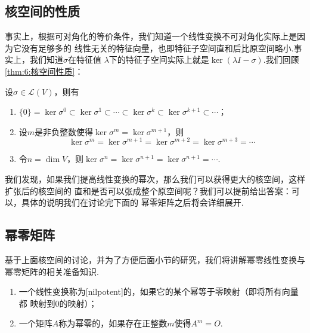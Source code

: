 \subsection{核空间的性质}
事实上，根据可对角化的等价条件，我们知道一个线性变换不可对角化实际上是因为它没有足够多的
线性无关的特征向量，也即特征子空间直和后比原空间略小.事实上，我们知道$\sigma$在特征值
$\lambda$下的特征子空间实际上就是$\ker(\lambda I-\sigma)$.我们回顾\autoref{thm:6:核空间性质}：
\begin{theorem}\label{thm:20:核空间性质}
    设$\sigma\in \mathcal{L}(V)$，则有
    \begin{enumerate}
        \item $\{0\}=\ker \sigma^0\subset\ker \sigma^1\subset\cdots\subset
        \ker \sigma^k\subset\ker \sigma^{k+1}\subset\cdots$；

        \item 设$m$是非负整数使得$\ker \sigma^m=\ker \sigma^{m+1}$，则
        \[\ker \sigma^m=\ker \sigma^{m+1}=\ker \sigma^{m+2}=\ker \sigma^{m+3}=\cdots\]

        \item 令$n=\dim V$，则$\ker \sigma^n=\ker \sigma^{n+1}=\ker \sigma^{n+1}=\cdots$.
    \end{enumerate}
\end{theorem}

我们发现，如果我们提高线性变换的幂次，那么我们可以获得更大的核空间，这样扩张后的核空间的
直和是否可以张成整个原空间呢？我们可以提前给出答案：可以，具体的说明我们在讨论完下面的
幂零矩阵之后将会详细展开.

\subsection{幂零矩阵}
基于上面核空间的讨论，并为了方便后面小节的研究，我们将讲解幂零线性变换与幂零矩阵的相关准备知识.
\begin{definition}
    \begin{enumerate}
        \item 一个线性变换称为[nilpotent]的，如果它的某个幂等于零映射（即将所有向量都
        映射到0的映射）；
        \item 一个矩阵$A$称为幂零的，如果存在正整数$m$使得$A^m=O$.
    \end{enumerate}
\end{definition}

